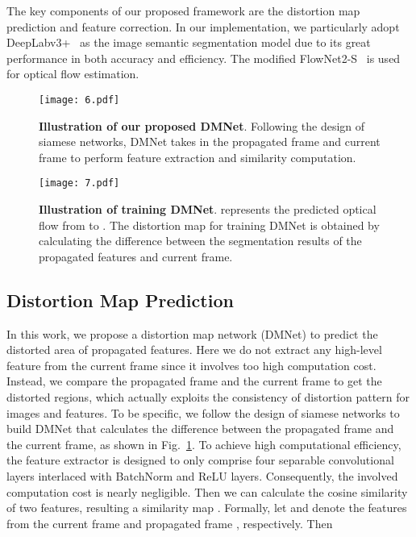 \documentclass[journal]{IEEEtran}
\begin{document}
The key components of our proposed framework are the distortion map prediction and feature correction. In our implementation, we particularly adopt DeepLabv3+~\cite{chen2018encoder} as the image semantic segmentation model due to its great performance in both accuracy and efficiency. The modified FlowNet2-S~\cite{ilg2017flownet} is used for optical flow estimation. 

\begin{figure}[t]
	\begin{center}
		\texttt{[image: 6.pdf]}
	\end{center}
	\caption{\textbf{Illustration of our proposed DMNet}. Following the design of siamese networks, DMNet takes in the propagated frame and current frame to perform feature extraction and similarity computation.}
	\label{DMNet}
\end{figure}

\begin{figure}[t]
	\begin{center}
		\texttt{[image: 7.pdf]}
	\end{center}
	\caption{\textbf{Illustration of training DMNet}.  represents the predicted optical flow from  to . The distortion map for training DMNet is obtained by calculating the difference between the segmentation results of the propagated features and current frame.}
	\label{DMNet_training}
\end{figure}

\subsection{Distortion Map Prediction}

In this work, we propose a distortion map network (DMNet) to predict the distorted area of propagated features. Here we do not extract any high-level feature from the current frame since it involves too high computation cost. Instead, we compare the propagated frame and the current frame to get the distorted regions, which actually exploits the consistency of distortion pattern for images and features. 
To be specific, we follow the design of siamese networks to build DMNet that calculates the difference between the propagated frame and the current frame, as shown in Fig.~\ref{DMNet}. To achieve high computational efficiency, the feature extractor is designed to only comprise four separable convolutional layers interlaced with BatchNorm and ReLU layers. Consequently, the involved computation cost is nearly negligible. Then we can calculate the cosine similarity of two features, resulting a similarity map . Formally, let  and  denote the features from the current frame  and propagated frame , respectively. Then
\end{document}
